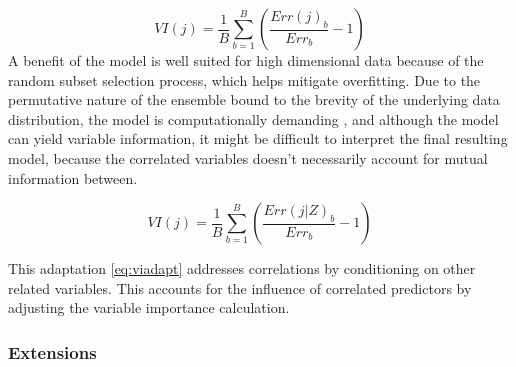 \begin{equation} \label{eq:vinorm}
VI(j) = \frac{1}{B}\sum_{b=1}^{B}(\frac{Err(j)_{b}}{Err_{b}}-1)
\end{equation}
\noindent A benefit of the model is well suited for high dimensional data because of the random subset selection process, which helps mitigate overfitting. Due to the permutative nature of the ensemble bound to the brevity of the underlying data distribution, the model is computationally demanding \parencite{pham_springer_2023}, and although the model can yield variable information, it might be difficult to interpret the final resulting model, because the correlated variables doesn't necessarily account for mutual information between.

\begin{equation} \label{eq:viadapt}VI(j) = \frac{1}{B}\sum_{b=1}^{B}(\frac{Err(j|Z)_{b}}{Err_{b}}-1)\end{equation}

\noindent This adaptation \ref{eq:viadapt} addresses correlations \parencite{pham_springer_2023} by conditioning on other related variables. This accounts for the influence of correlated predictors by adjusting the variable importance calculation.

\subsubsection{Extensions}

